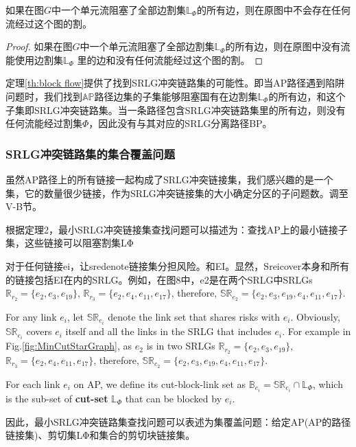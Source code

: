 \begin{theorem}
    如果在图$G$中一个单元流阻塞了全部边割集$\mathbb{L}_{\Phi}$的所有边，则在原图中不会存在任何流经过这个图的割。
\label{th:block flow}
\end{theorem}


\begin{proof}
    如果在图$G$中一个单元流阻塞了全部边割集$\mathbb{L}_{\Phi}$的所有边，则在原图中没有流能使用边割集$\mathbb{L}_{\Phi}$ 里的边和没有任何流能经过这个图的割。
\end{proof}
定理\ref{th:block flow}提供了找到SRLG冲突链路集的可能性。即当AP路径遇到陷阱问题时，我们找到$\mathbb{AP}$路径边集的子集能够阻塞国有在边割集$\mathbb{L}_{\Phi}$的所有边，和这个子集即SRLG冲突链路集。当一条路径包含SRLG冲突链路集里的所有边，则没有任何流能经过割集$\Phi$，因此没有与其对应的SRLG分离路径BP。

\subsubsection{SRLG冲突链路集的集合覆盖问题}
虽然AP路径上的所有链接一起构成了SRLG冲突链接集，我们感兴趣的是一个集，它的数量很少链接，作为SRLG冲突链接集的大小确定分区的子问题数。调至V-B节。

根据定理2，最小SRLG冲突链接集查找问题可以描述为：查找AP上的最小链接子集，这些链接可以阻塞割集LΦ

对于任何链接ei，让sredenote链接集分担风险。和EI。显然，Sreicover本身和所有的链接包括EI在内的SRLG。例如，在图8中，e2是在两个SRLG中SRLGs $\mathbb{R}_{r_2}=\{e_2,e_3,e_{19}\}$, $\mathbb{R}_{r_3}=\{e_2,e_4,e_{11},e_{17}\}$, therefore, $\mathbb{SR}_{e_2}=\{e_2,e_3,e_{19},e_4,e_{11},e_{17}\}$.


For any link $e_i$, let $\mathbb{SR}_{e_i}$ denote the link set that shares risks with $e_i$. Obviously, $\mathbb{SR}_{e_i}$ covers $e_i$ itself and all the links in the SRLG that includes $e_i$. For example in Fig.\ref{fig:MinCutStarGraph}, as $e_2$ is in two SRLGs $\mathbb{R}_{r_2}=\{e_2,e_3,e_{19}\}$, $\mathbb{R}_{r_3}=\{e_2,e_4,e_{11},e_{17}\}$, therefore, $\mathbb{SR}_{e_2}=\{e_2,e_3,e_{19},e_4,e_{11},e_{17}\}$.

For each link $e_i$ on AP, we define its cut-block-link set as ${\mathbb{B}_{{e_i}}} = \mathbb{SR}_{{e_i}} \cap \mathbb{L}_{\Phi}$, which is the sub-set of \textbf{cut-set} $\mathbb{L}_{\Phi}$ that can be blocked by $e_i$.

因此，最小SRLG冲突链路集查找问题可以表述为集覆盖问题：给定AP(AP的路径链接集)、剪切集LΦ和集合的剪切块链接集。

